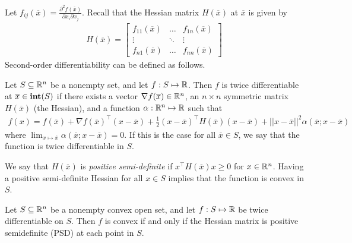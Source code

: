 Let $f_{ij}(\overline{x}) = \frac{\partial^2f(\overline{x})}{\partial x_i\partial x_j }$. Recall that the Hessian matrix  $H(\overline{x})$ at $\overline{x}$ is given by
%
\begin{align*}H(\overline{x}) = 
	\begin{bmatrix}
	f_{11}(\overline{x}) & \dots & f_{1n}(\overline{x})\\
	\vdots & \ddots & \vdots\\
	f_{n1}(\overline{x}) & \dots & f_{nn}(\overline{x})
	\end{bmatrix}
\end{align*}
%
Second-order differentiability can be defined as follows.
%
\begin{definition}
	Let $S \subseteq \mathbb{R}^n$ be a nonempty set, and let $f:S \mapsto \mathbb{R}$. Then $f$ is twice differentiable at $\overline{x} \in \mathop{\bf int}(S)$ if there exists a vector $\nabla f(\overline{x})\in \mathbb{R}^n$, an $n \times n$ symmetric matrix $H(\overline{x})$ (the Hessian), and a function $\alpha: \mathbb{R}^n \mapsto \mathbb{R}$ such that 
	\begin{align*}
	f(x) = f(\overline{x}) + \nabla f(\overline{x})^\top(x - \overline{x}) + 
	\frac{1}{2}(x - \overline{x})^\top H(\overline{x})(x - \overline{x}) + 
	||x-\overline{x}||^2\alpha(\overline{x};x-\overline{x})
	\end{align*}
	where $\lim_{x \mapsto \overline{x}}\alpha(\overline{x}; x - \overline{x})=0$. If this is the case for all $\overline{x} \in S$, we say that the function is twice differentiable in $S$.
\end{definition}
%
We say that $H(\overline{x})$ is \emph{positive semi-definite} if $x^\top H(\overline{x})x \geq 0$ for $x \in \mathbb{R}^n$. Having a positive semi-definite Hessian for all $x \in S$ implies that the function is convex in $S$. 
%
\begin{theorem}
	Let $S \subseteq \mathbb{R}^n$ be a nonempty convex open set, and let $f:S \mapsto \mathbb{R}$ be twice differentiable on $S$.\hspace{-4pt} Then\hspace{-1pt} $f$\hspace{-1pt} is convex if and only if the Hessian matrix is positive semidefinite (PSD) at each point in $S$.
\end{theorem}
%
